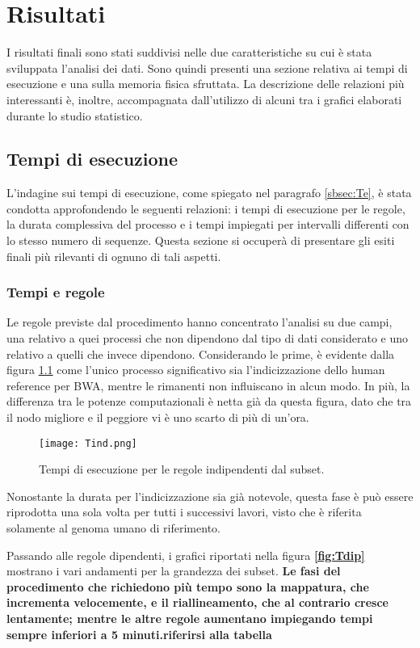 \chapter{Risultati}
\label{cap:3}
I risultati finali sono stati suddivisi nelle due caratteristiche su cui è stata sviluppata l'analisi dei dati.
Sono quindi presenti una sezione relativa ai tempi di esecuzione e una sulla memoria fisica sfruttata. 
La descrizione delle relazioni più interessanti è, inoltre, accompagnata dall'utilizzo di alcuni tra i grafici elaborati durante lo studio statistico.

\section{Tempi di esecuzione}
L'indagine sui tempi di esecuzione, come spiegato nel paragrafo \ref{sbsec:Te}, è stata condotta approfondendo le seguenti relazioni: i tempi di esecuzione per le regole, la durata complessiva del processo e i tempi impiegati per intervalli differenti con lo stesso numero di sequenze. 
Questa sezione si occuperà di presentare gli esiti finali più rilevanti di ognuno di tali aspetti.

\subsection{Tempi e regole}
Le regole previste dal procedimento hanno concentrato l'analisi su due campi, una relativo a quei processi che non dipendono dal tipo di dati considerato e uno relativo a quelli che invece dipendono. 
Considerando le prime, è evidente dalla figura \ref{fig:Tind} come l'unico processo significativo sia l'indicizzazione dello human reference per BWA, mentre le rimanenti non influiscano in alcun modo. 
In più, la differenza tra le potenze computazionali è netta già da questa figura, dato che tra il nodo migliore e il peggiore vi è uno scarto di più di un'ora.
\begin{figure}[H]
\centering
\texttt{[image: Tind.png]}
\caption{Tempi di esecuzione per le regole indipendenti dal subset.}
\label{fig:Tind}
\end{figure}
Nonostante la durata per l'indicizzazione sia già notevole, questa fase  è  può essere riprodotta una sola volta per tutti i successivi lavori, visto che è riferita solamente al genoma umano di riferimento.

Passando alle regole dipendenti, i grafici riportati nella figura \textbf{\ref{fig:Tdip}} mostrano i vari andamenti per la grandezza dei subset.
\textbf{Le fasi del procedimento che richiedono più tempo sono la mappatura, che incrementa velocemente, e il riallineamento, che al contrario cresce lentamente; mentre le altre regole aumentano impiegando tempi sempre inferiori a 5 minuti.riferirsi alla tabella}

